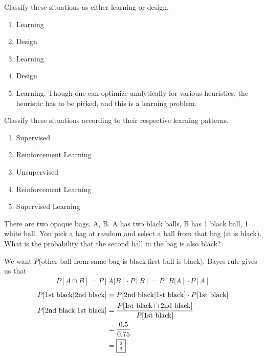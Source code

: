 \documentclass[10pt]{article}
\newenvironment{problem}[2][Problem]{\begin{trivlist}
\item[\hskip \labelsep {\bfseries #1}\hskip \labelsep {\bfseries #2.}]}{\end{trivlist}}
\newenvironment{exercise}[2][Exercise]{\begin{trivlist}
\item[\hskip \labelsep {\bfseries #1}\hskip \labelsep {\bfseries #2.}]}{\end{trivlist}}
\begin{document}
\begin{exercise}{1.4} Classify these situations as either learning or design.
  \begin{enumerate}
  \item Learning
  \item Design
  \item Learning
  \item Design
  \item Learning. Though one can optimize analytically for various
    heuristics, the heuristic has to be picked, and this is a learning
    problem.
  \end{enumerate}
\end{exercise}

\begin{exercise}{1.6} Classify these situations according to their respective learning patterns.
  \begin{enumerate}
  \item Supervised
  \item Reinforcement Learning
  \item Unsupervised
  \item Reinforcement Learning
  \item Supervised Learning
  \end{enumerate}
\end{exercise}

\begin{problem}{1.1}
  There are two opaque bags, A, B. A has two black balls, B has 1 black ball, 1 white ball.
  You pick a bag at random and select a ball from that bag (it is black). What is the probability
  that the second ball in the bag is also black?

  We want $P$(other ball from same bag is black$\vert$first ball is black). Bayes
  rule gives us that
  \begin{align}
    P[A\cap B] = P[A \vert B] \cdot P[B] = P[B\vert A]\cdot P[A]
  \end{align}
  \begin{align*}
    P[\mathrm{1st~black} \vert \mathrm{2nd~black}] &= P[\mathrm{2nd~black} \vert \mathrm{1st~black}] \cdot P[\mathrm{1st~black}] \\
    P[\mathrm{2nd~black} \vert \mathrm{1st~black}] &= \frac{P[\mathrm{1st~black} \cap \mathrm{2nd~black}]}{P[\mathrm{1st~black}]} \\
                                                   &= \frac{0.5}{0.75} \\
                                                   &= \fbox{$\frac{2}{3}$}
  \end{align*}
\end{problem}
\end{document}
